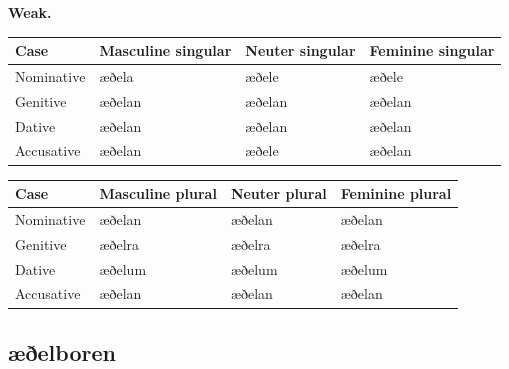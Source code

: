 \textbf{Weak.}

\par\begingroup
\fontsize{10.5}{13.2}\selectfont
\setlength{\LTleft}{0pt}\setlength{\LTright}{\fill}
\noindent
\begin{tabular}{@{}>{\raggedright\arraybackslash}p{22.0mm}>{\raggedright\arraybackslash}p{31.188mm}>{\raggedright\arraybackslash}p{31.188mm}>{\raggedright\arraybackslash}p{31.188mm}@{}}
\toprule
\textbf{Case} & \textbf{Masculine singular} & \textbf{Neuter singular} & \textbf{Feminine singular} \\
\midrule
Nominative & æðela & æðele & æðele \\
Genitive & æðelan & æðelan & æðelan \\
Dative & æðelan & æðelan & æðelan \\
Accusative & æðelan & æðele & æðelan \\
\bottomrule
\end{tabular}
\par\endgroup
\par\addvspace{5pt}
\par\begingroup
\fontsize{10.5}{13.2}\selectfont
\setlength{\LTleft}{0pt}\setlength{\LTright}{\fill}
\noindent
\begin{tabular}{@{}>{\raggedright\arraybackslash}p{22.0mm}>{\raggedright\arraybackslash}p{31.188mm}>{\raggedright\arraybackslash}p{31.188mm}>{\raggedright\arraybackslash}p{31.188mm}@{}}
\toprule
\textbf{Case} & \textbf{Masculine plural} & \textbf{Neuter plural} & \textbf{Feminine plural} \\
\midrule
Nominative & æðelan & æðelan & æðelan \\
Genitive & æðelra & æðelra & æðelra \\
Dative & æðelum & æðelum & æðelum \\
Accusative & æðelan & æðelan & æðelan \\
\bottomrule
\end{tabular}
\par\endgroup

\subsection*{æðelboren}

